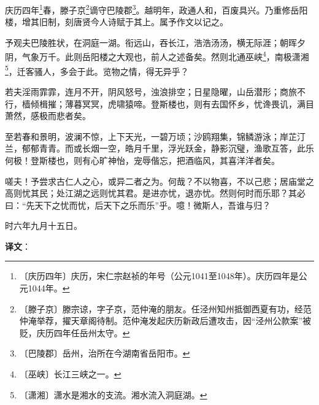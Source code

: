 \documentclass[12pt,UTF-8,openany]{ctexbook}
\begin{document}
\begin{normalsize}
    
    庆历四年\footnote{〔庆历四年〕庆历，宋仁宗赵祯的年号（公元1041至1048年）。庆历四年是公元1044年。}春，滕子京\footnote{〔滕子京〕滕宗谅，字子京，范仲淹的朋友。任泾州知州抵御西夏有功，经范仲淹举荐，擢天章阁待制。范仲淹发起庆历新政后遭攻击，因“泾州公款案”被贬，庆历四年任岳州太守。}谪守巴陵郡\footnote{〔巴陵郡〕岳州，治所在今湖南省岳阳市。}。越明年，政通人和，百废具兴。乃重修岳阳楼，增其旧制，刻唐贤今人诗赋于其上。属予作文以记之。
    
    予观夫巴陵胜状，在洞庭一湖。衔远山，吞长江，浩浩汤汤，横无际涯；朝晖夕阴，气象万千。此则岳阳楼之大观也，前人之述备矣。然则北通巫峡\footnote{〔巫峡〕长江三峡之一。}，南极潇湘\footnote{〔潇湘〕潇水是湘水的支流。湘水流入洞庭湖。}，迁客骚人，多会于此。览物之情，得无异乎？
    
    若夫淫雨霏霏，连月不开，阴风怒号，浊浪排空；日星隐曜，山岳潜形；商旅不行，樯倾楫摧；薄暮冥冥，虎啸猿啼。登斯楼也，则有去国怀乡，忧谗畏讥，满目萧然，感极而悲者矣。
    
    至若春和景明，波澜不惊，上下天光，一碧万顷；沙鸥翔集，锦鳞游泳；岸芷汀兰，郁郁青青。而或长烟一空，皓月千里，浮光跃金，静影沉璧，渔歌互答，此乐何极！登斯楼也，则有心旷神怡，宠辱偕忘，把酒临风，其喜洋洋者矣。
    
    嗟夫！予尝求古仁人之心，或异二者之为。何哉？不以物喜，不以己悲；居庙堂之高则忧其民；处江湖之远则忧其君。是进亦忧，退亦忧。然则何时而乐耶？其必曰：“先天下之忧而忧，后天下之乐而乐”乎。噫！微斯人，吾谁与归？
    
    时六年九月十五日。
\end{normalsize}


\newpage

\textbf{译文}：

\vspace{1em}
\end{document}
